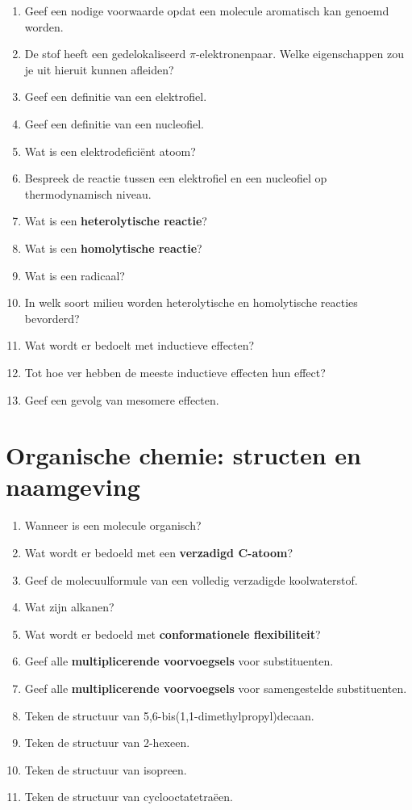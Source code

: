 \documentclass[a4paper,12pt]{article}
\begin{document}
\begin{enumerate}
        \item Geef een nodige voorwaarde opdat een molecule aromatisch kan genoemd worden.
        \item De stof  heeft een gedelokaliseerd $\pi$-elektronenpaar. Welke eigenschappen zou je uit hieruit kunnen afleiden? 
        \item Geef een definitie van een elektrofiel.
        \item Geef een definitie van een nucleofiel.
        \item Wat is een elektrodefici\"ent atoom?
        \item Bespreek de reactie tussen een elektrofiel en een nucleofiel op thermodynamisch niveau.
        \item Wat is een \textbf{heterolytische reactie}?
        \item Wat is een \textbf{homolytische reactie}?
        \item Wat is een radicaal?
        \item In welk soort milieu worden heterolytische en homolytische reacties bevorderd?
        \item Wat wordt er bedoelt met inductieve effecten?
        \item Tot hoe ver hebben de meeste inductieve effecten hun effect?
        \item Geef een gevolg van mesomere effecten.
    \end{enumerate}

    \section{Organische chemie: structen en naamgeving}
    \begin{enumerate}
        \item Wanneer is een molecule organisch?
        \item Wat wordt er bedoeld met een \textbf{verzadigd C-atoom}?
        \item Geef de molecuulformule van een volledig verzadigde koolwaterstof.
        \item Wat zijn alkanen?
        \item Wat wordt er bedoeld met \textbf{conformationele flexibiliteit}?
        \item Geef alle \textbf{multiplicerende voorvoegsels} voor substituenten.
        \item Geef alle \textbf{multiplicerende voorvoegsels} voor samengestelde substituenten.
        \item Teken de structuur van 5,6-bis(1,1-dimethylpropyl)decaan.
        \item Teken de structuur van 2-hexeen.
        \item Teken de structuur van isopreen.
        \item Teken de structuur van cyclooctatetra\"een.
    \end{enumerate}
\end{document}
